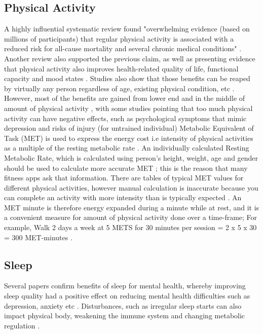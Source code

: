\subsection{Physical Activity}
A highly influential systematic review found "overwhelming evidence (based on millions of participants) that regular physical activity is associated with a reduced risk for all-cause mortality and several chronic medical conditions" \cite{Warburton2017Health}. Another review also supported the previous claim, as well as presenting evidence that physical activity also improves health-related quality of life, functional capacity and mood states \cite{Penedo2005Exercise}. Studies also show that those benefits can be reaped by virtually any person regardless of age, existing physical condition, etc \cite{Penedo2005Exercise, Warburton2017Health}. However, most of the benefits are gained from lower end and in the middle of amount of physical activity \cite{Powell2011Physical}, with some studies pointing that too much physical activity can have negative effects, such as psychological symptoms that mimic depression \cite{Paluska2000Physical} and risks of injury (for untrained individual) \cite{Melzer2004Physical}
Metabolic Equivalent of Task (MET) is used to express the energy cost i.e intensity of physical activities as a multiple of the resting metabolic rate \cite{Jetté1990Metabolic}. An individually calculated Resting Metabolic Rate, which is calculated using person's height, weight, age and gender should be used to calculate more accurate MET \cite{Byrne2005Metabolic}; this is the reason that many fitness apps ask that information. There are tables of typical MET values for different physical activities, however manual calculation is inaccurate because you can complete an activity with more intensity than is typically expected \cite{Jetté1990Metabolic}. An MET minute is therefore energy expanded during a minute while at rest, and it is a convenient measure for amount of physical activity done over a time-frame; For example, Walk 2 days a week at 5 METS for 30 minutes per session = 2 x 5 x 30 = 300 MET-minutes \cite{metMinutes}.
\subsection{Sleep}
Several papers confirm benefits of sleep for mental health, whereby improving sleep quality had a positive effect on reducing mental health difficulties such as depression, anxiety etc \cite{sleep1, sleep2, sleep3}. Disturbances, such as irregular sleep starts can also impact physical body, weakening the immune system \cite{sleep4} and changing metabolic regulation \cite{sleep2}.

